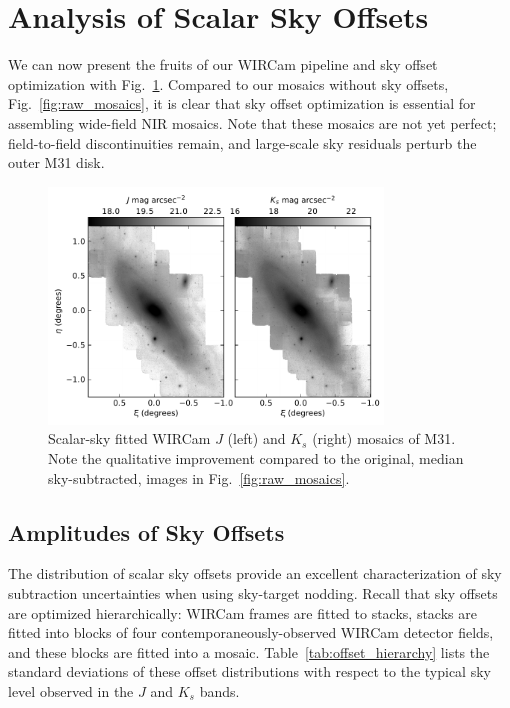 \documentclass[iop]{emulateapj}
\newcommand{\Fig}[1]{Fig.~\ref{fig:#1}}  %
\newcommand{\Tab}[1]{Table~\ref{tab:#1}}  %
\begin{document}
\section{Analysis of Scalar Sky Offsets}
\label{sec:scalaranalysis}

We can now present the fruits of our WIRCam pipeline and sky offset optimization with \Fig{scalar_mosaics}.
Compared to our mosaics without sky offsets, \Fig{raw_mosaics}, it is clear that sky offset optimization is essential for assembling wide-field NIR mosaics.
Note that these mosaics are not yet perfect; field-to-field discontinuities remain, and large-scale sky residuals perturb the outer M31 disk.

\begin{figure}[t]
	\centering
		\includegraphics[width=3.5in]{figs/scalar_mosaics}
	\caption{Scalar-sky fitted WIRCam $J$ (left) and $K_s$ (right) mosaics of M31. Note the qualitative improvement compared to the original, median sky-subtracted, images in \Fig{raw_mosaics}.}
	\label{fig:scalar_mosaics}
\end{figure}

\subsection{Amplitudes of Sky Offsets}
\label{sec:offset_amplitudes}

The distribution of scalar sky offsets provide an excellent characterization of sky subtraction uncertainties when using sky-target nodding.
Recall that sky offsets are optimized hierarchically: WIRCam frames are fitted to stacks, stacks are fitted into blocks of four contemporaneously-observed WIRCam detector fields, and these blocks are fitted into a mosaic.
\Tab{offset_hierarchy} lists the standard deviations of these offset distributions with respect to the typical sky level observed in the $J$ and $K_s$ bands.
\end{document}
